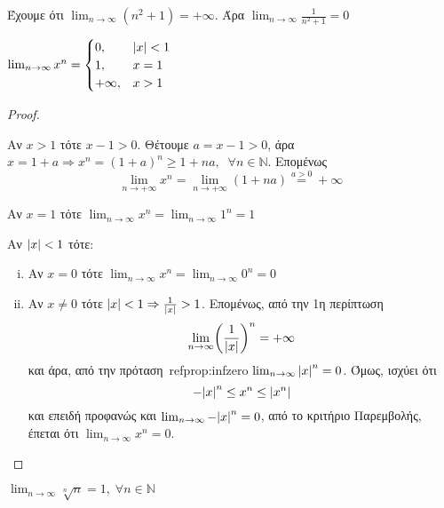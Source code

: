 \documentclass[a4paper,table]{report}
\begin{document}
\begin{example}
  Έχουμε ότι $ \lim_{n \to \infty} (n^{2}+1) = +\infty $. Άρα 
  $ \lim_{n \to \infty} \frac{1}{n^{2}+1} = 0 $
\end{example}

\begin{mybox3}
  \begin{prop}
    $ \lim_{n \to \infty} x^{n} = 
    \begin{cases} 
      0, & \abs{x} < 1 \\
      1, & x=1 \\
      +\infty, & x > 1
    \end{cases} $ 
  \end{prop}
\end{mybox3}
\begin{proof}
\item {}
  \begin{myitemize}
    \item Αν $ x>1 $ τότε $ x-1>0 $. Θέτουμε $ a = x-1>0 $, άρα $ x = 1+a 
      \Rightarrow x^{n} = (1+a)^{n} \geq 1+na, \; \; \forall n \in \mathbb{N} $.
      Επομένως 
      \[
        \lim_{n \to +\infty} x^{n} = \lim_{n \to +\infty} (1+na) 
        \overset{a>0}{=} +\infty 
      \]
    \item Αν $ x=1 $ τότε $ \lim_{n \to \infty} x^{n} = \lim_{n \to \infty} 1^{n} = 1 $
    \item Αν $ \abs{x} < 1 $ τότε: 
      \begin{enumerate}[i)]
        \item Αν $ x=0 $ τότε $ \lim_{n \to \infty} x^{n} = 
          \lim_{n \to \infty} 0^{n} = 0 $
        \item Αν $ x \neq 0 $ τότε $ \abs{x} < 1 \Rightarrow \frac{1}{\abs{x}} > 1$. 
          Επομένως, από την 1η περίπτωση
          \[
            \lim_{n \to \infty} \biggl(\frac{1}{\abs{x}}\biggr)^{n} = + \infty
          \] 
          και άρα, από την πρόταση~ref{prop:infzero} 
          $ \lim_{n \to \infty} \abs{x} ^{n} = 0 $. Όμως, ισχύει ότι
          \[
            - \abs{x} ^{n} \leq x^{n} \leq \abs{x^{n}}
          \]
          και επειδή προφανώς και $ \lim_{n \to \infty} - \abs{x} ^{n} = 0 $, από 
          το κριτήριο Παρεμβολής, έπεται ότι $ \lim_{n \to \infty} x^{n} = 0 $.
      \end{enumerate}
  \end{myitemize}
\end{proof}


\begin{mybox3}
  \begin{prop}
    $ \lim_{n \to \infty} \sqrt[n]{n} = 1, \; \forall n \in \mathbb{N}  $
  \end{prop}
\end{mybox3}
\end{document}
